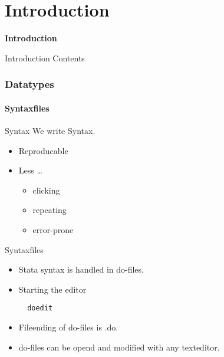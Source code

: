 \part{Introduction}
\begin{frame}
\thispagestyle{empty}
\textbf{\huge{Introduction}}
\end{frame}

\begin{frame}{Introduction Contents}
 \tableofcontents
\end{frame}


\section{Datatypes}
\subsection{Syntaxfiles}
\begin{frame}[fragile]{Syntax}
 We write Syntax.
 \begin{itemize}
  \item Reproducable
  \item Less \dots
  \begin{itemize}
   \item clicking
   \item repeating
   \item error-prone
  \end{itemize}
 \end{itemize}
\end{frame}

\begin{frame}[fragile]{Syntaxfiles}
  \begin{itemize}
  \item Stata syntax is handled in do-files. 
  \item Starting the editor 
  \begin{lstlisting}
  doedit
  \end{lstlisting}
  \item Fileending of do-files is .do.
  \item do-files can be opend and modified with any texteditor.
  \end{itemize}
\end{frame}

